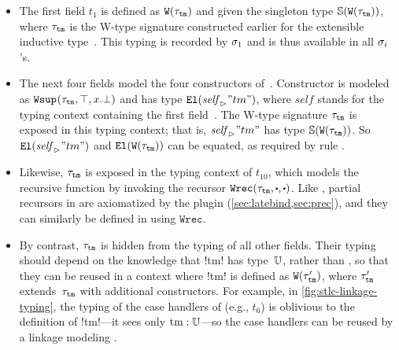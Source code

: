 \begin{itemize}
  [labelsep=*,leftmargin=1pc,itemsep=3pt]

\item 
The first field $t_1$ is defined as $\texttt{W}({\tau_{\texttt{tm}}})$
and given the singleton type $\mathbb{S}({\texttt{W}({\tau_{\texttt{tm}}})})$, where $\tau_{\texttt{tm}}$
is the W-type signature constructed earlier for the extensible inductive type~.
This typing is recorded by $\sigma_1$ and is thus available in all $\sigma_i$'s.

\item 
The next four fields model the four constructors of~.
Constructor  is modeled as $\texttt{Wsup}_{}({\tau_{\texttt{tm}}},{\top},{x.\bot})$
and has type $\texttt{El}({{\mathit{self}}_{\rhd}{"tm"}})$, where $\mathit{self}$ stands for
the typing context containing the first field~.
The W-type signature $\tau_{\texttt{tm}}$ is exposed in
this typing context; that is, ${\mathit{self}}_{\rhd}{"tm"}$ has type $\mathbb{S}({\texttt{W}({\tau_{\texttt{tm}}})})$.
So $\texttt{El}({{\mathit{self}}_{\rhd}{"tm"}})$ and $\texttt{El}({\texttt{W}({\tau_{\texttt{tm}}})})$ can be equated,
as required by rule .

\item
Likewise, $\tau_{\texttt{tm}}$ is exposed in the typing context of
$t_{10}$, which models the recursive function  by invoking
the recursor $\Wrec{\wsig_{\texttt{tm}}}{\cDot}{\cDot}$.
%
Like , partial recursors in \Lang are axiomatized by the plugin
(\cref{sec:latebind,sec:prec}), and they can similarly be defined in \TT
using $\texttt{Wrec}$.

\item
By contrast, $\tau_{\texttt{tm}}$ is hidden from the typing of all other fields.
Their typing should depend on the knowledge that \lsti!tm! has type~$\mathbb{U}$,
rather than ,
so that they can be reused in a context where
\lsti!tm! is defined as $\texttt{W}({\tau'_{\texttt{tm}}})$,
where $\tau'_{\texttt{tm}}$ extends~$\tau_{\texttt{tm}}$ with additional constructors.
%
For example, in \cref{fig:stlc-linkage-typing}, the typing of the case handlers of
 (e.g., $t_6$) is oblivious to the definition of \lsti!tm!---it sees only $\text{\lsti!tm!}:\cU$---so
the case handlers can be reused by a linkage modeling .

\end{itemize}

